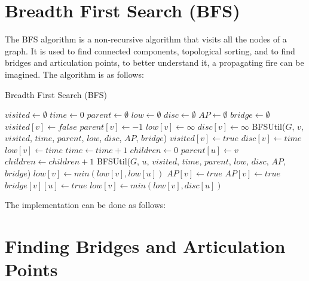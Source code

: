 \section{Breadth First Search (BFS)}

The BFS algorithm is a non-recursive algorithm that visits all the nodes of a graph. It is used to find connected components, topological sorting, and to find bridges and articulation points, to better understand it, a propagating fire can be imagined. The algorithm is as follows:

\begin{algorithm}
\caption{Breadth First Search (BFS)}
\label{alg:bfs}
\begin{algorithmic}[1]
\State $visited \gets \emptyset$
\State $time \gets 0$
\State $parent \gets \emptyset$
\State $low \gets \emptyset$
\State $disc \gets \emptyset$
\State $AP \gets \emptyset$
\State $bridge \gets \emptyset$
\State $visited[v] \gets false$
\State $parent[v] \gets -1$
\State $low[v] \gets \infty$
\State $disc[v] \gets \infty$
\EndFor
{}
\State BFSUtil($G$, $v$, $visited$, $time$, $parent$, $low$, $disc$, $AP$, $bridge$)
\EndIf
\EndFor
\EndProcedure
{}
\State $visited[v] \gets true$
\State $disc[v] \gets time$
\State $low[v] \gets time$
\State $time \gets time + 1$
\State $children \gets 0$
\State $parent[u] \gets v$
\State $children \gets children + 1$
\State BFSUtil($G$, $u$, $visited$, $time$, $parent$, $low$, $disc$, $AP$, $bridge$)
\State $low[v] \gets min(low[v], low[u])$
\State $AP[v] \gets true$
\EndIf
{}
\State $AP[v] \gets true$
\EndIf
{}
\State $bridge[v][u] \gets true$
\EndIf
\Else
\State $low[v] \gets min(low[v], disc[u])$
\EndIf
\EndFor
\EndProcedure
\end{algorithmic}
\end{algorithm}

The implementation can be done as follows:




\section{Finding Bridges and Articulation Points}

